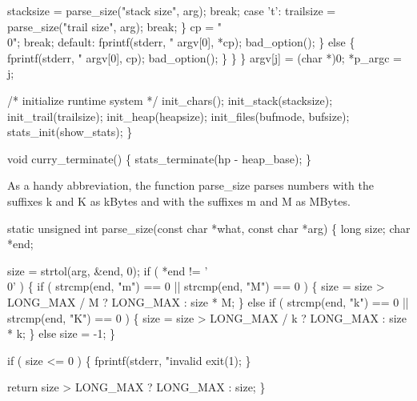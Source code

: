                             stacksize = parse_size("stack size", arg);
                            break;
                        case 't':
                            trailsize = parse_size("trail size", arg);
                            break;
                        \}
                        cp = "\\0";
                        break;
                    default:
                        fprintf(stderr,
                                "%
                                argv[0], *cp);
                        bad_option();
                    \}
            else
            \{
                fprintf(stderr, "%
                        argv[0], cp);
                bad_option();
            \}
        \}
    \}
    argv[j] = (char *)0;
    *p_argc = j;

    /* initialize runtime system */
    init_chars();
    init_stack(stacksize);
    init_trail(trailsize);
    init_heap(heapsize);
    init_files(bufmode, bufsize);
    stats_init(show_stats);
\}

void
curry_terminate()
\{
    stats_terminate(hp - heap_base);
\}

\nwendcode{}\nwdocspar
As a handy abbreviation, the function {\Tt{}parse{\_}size\nwendquote} parses numbers
with the suffixes {\Tt{}k\nwendquote} and {\Tt{}K\nwendquote} as kBytes and with the suffixes
{\Tt{}m\nwendquote} and {\Tt{}M\nwendquote} as MBytes.

\nwenddocs{}\plusendmoddef\nwstartdeflinemarkup{}\nwenddeflinemarkup
static unsigned int
parse_size(const char *what, const char *arg)
\{
    long size;
    char *end;

    size = strtol(arg, &end, 0);
    if ( *end != '\\0' )
    \{
        if ( strcmp(end, "m") == 0 || strcmp(end, "M") == 0 )
        \{
            size = size > LONG_MAX / M ? LONG_MAX : size * M;
        \}
        else if ( strcmp(end, "k") == 0 || strcmp(end, "K") == 0 )
        \{
            size = size > LONG_MAX / k ? LONG_MAX : size * k;
        \}
        else
            size = -1;
    \}

    if ( size <= 0 )
    \{
        fprintf(stderr, "invalid %
        exit(1);
    \}

    return size > LONG_MAX ? LONG_MAX : size;
\}
\nwendcode{}

%
%

